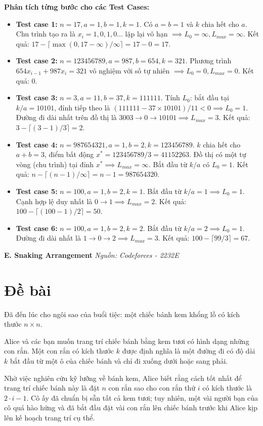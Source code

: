 \documentclass[12pt,a4paper]{article}
\newcommand{\problem}[2]{%
  \addcontentsline{toc}{section}{#1}%
  \begin{mdframed}[
    linecolor=framecolor,
    linewidth=1.5pt,
    backgroundcolor=white,
    topline=true, bottomline=true,
    leftline=true, rightline=true,
    innerleftmargin=10pt, innerrightmargin=10pt,
    innertopmargin=6pt, innerbottommargin=6pt,
  ]
  \textbf{\large #1} \hfill \textit{Nguồn: #2}
  \end{mdframed}
  \vspace{4pt}%
}
\begin{document}
\textbf{Phân tích từng bước cho các Test Cases:}
\begin{itemize}
    \item \textbf{Test case 1:} $n=17, a=1, b=1, k=1$. Có $a=b=1$ và $k$ chia hết cho $a$. Chu trình tạo ra là $x_i = 1, 0, 1, 0 \dots$ lặp lại vô hạn $\implies L_0 = \infty, L_{max} = \infty$. Kết quả: $17 - \lceil \max(0, 17-\infty)/\infty \rceil = 17 - 0 = 17$.
    \item \textbf{Test case 2:} $n=123456789, a=987, b=654, k=321$. Phương trình $654 x_{i-1} + 987 x_i = 321$ vô nghiệm với số tự nhiên $\implies L_0 = 0, L_{max} = 0$. Kết quả: 0.
    \item \textbf{Test case 3:} $n=3, a=11, b=37, k=111111$. Tính $L_0$: bắt đầu tại $k/a = 10101$, đỉnh tiếp theo là $(111111 - 37 \times 10101) / 11 < 0 \implies L_0 = 1$. Đường đi dài nhất trên đồ thị là $3003 \to 0 \to 10101 \implies L_{max} = 3$. Kết quả: $3 - \lceil (3 - 1)/3 \rceil = 2$.
    \item \textbf{Test case 4:} $n=987654321, a=1, b=2, k=123456789$. $k$ chia hết cho $a+b = 3$, điểm bất động $x^* = 123456789 / 3 = 41152263$. Đồ thị có một tự vòng (chu trình) tại đỉnh $x^* \implies L_{max} = \infty$. Bắt đầu từ $k/a$ có $L_0 = 1$. Kết quả: $n - \lceil (n-1)/\infty \rceil = n - 1 = 987654320$.
    \item \textbf{Test case 5:} $n=100, a=1, b=2, k=1$. Bắt đầu từ $k/a = 1 \implies L_0 = 1$. Cạnh hợp lệ duy nhất là $0 \to 1 \implies L_{max} = 2$. Kết quả: $100 - \lceil (100 - 1)/2 \rceil = 50$.
    \item \textbf{Test case 6:} $n=100, a=1, b=2, k=2$. Bắt đầu từ $k/a = 2 \implies L_0 = 1$. Đường đi dài nhất là $1 \to 0 \to 2 \implies L_{max} = 3$. Kết quả: $100 - \lceil 99/3 \rceil = 67$.
\end{itemize}

\newpage
\problem{E. Snaking Arrangement}{Codeforces - 2232E}

\section*{Đề bài}
Đã đến lúc cho ngôi sao của buổi tiệc: một chiếc bánh kem khổng lồ có kích thước $n \times n$.

Alice và các bạn muốn trang trí chiếc bánh bằng kem tươi có hình dạng những con rắn. Một con rắn có kích thước $k$ được định nghĩa là một đường đi có độ dài $k$ bắt đầu từ một ô của chiếc bánh và chỉ đi xuống dưới hoặc sang phải.

Nhờ việc nghiên cứu kỹ lưỡng về bánh kem, Alice biết rằng cách tốt nhất để trang trí chiếc bánh này là đặt $n$ con rắn sao cho con rắn thứ $i$ có kích thước là $2 \cdot i - 1$. Cô ấy đã chuẩn bị sẵn tất cả kem tươi; tuy nhiên, một vài người bạn của cô quá hào hứng và đã bắt đầu đặt vài con rắn lên chiếc bánh trước khi Alice kịp lên kế hoạch trang trí cụ thể.
\end{document}
